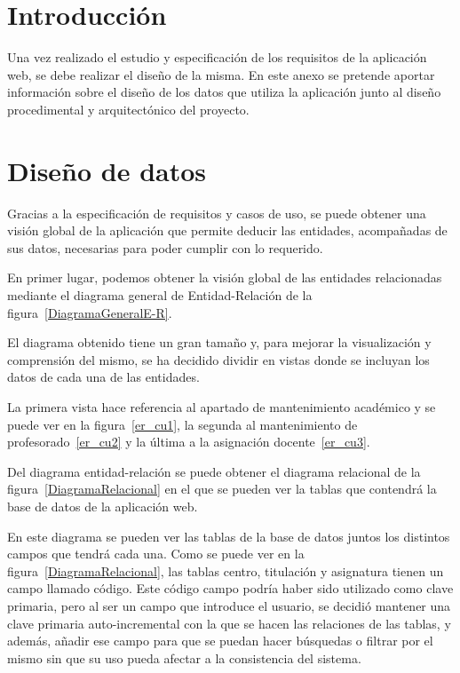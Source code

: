 
\section{Introducción}
Una vez realizado el estudio y especificación de los requisitos de la aplicación web, se debe realizar el diseño de la misma. En este anexo se pretende aportar información sobre el diseño de los datos que utiliza la aplicación junto al diseño procedimental y arquitectónico del proyecto.

\section{Diseño de datos}
Gracias a la especificación de requisitos y casos de uso, se puede obtener una visión global de la aplicación que permite deducir las entidades, acompañadas de sus datos, necesarias para poder cumplir con lo requerido.

En primer lugar, podemos obtener la visión global de las entidades relacionadas mediante el diagrama general de Entidad-Relación de la figura~\ref{DiagramaGeneralE-R}.

El diagrama obtenido tiene un gran tamaño y, para mejorar la visualización y comprensión del mismo, se ha decidido dividir en vistas donde se incluyan los datos de cada una de las entidades.

La primera vista hace referencia al apartado de mantenimiento académico y se puede ver en la figura~\ref{er_cu1}, la segunda al mantenimiento de profesorado~\ref{er_cu2} y la última a la asignación docente~\ref{er_cu3}.



Del diagrama entidad-relación se puede obtener el diagrama relacional de la figura~\ref{DiagramaRelacional} en el que se pueden ver la tablas que contendrá la base de datos de la aplicación web.

En este diagrama se pueden ver las tablas de la base de datos juntos los distintos campos que tendrá cada una.
Como se puede ver en la figura~\ref{DiagramaRelacional}, las tablas centro, titulación y asignatura tienen un campo llamado código. 
Este código campo podría haber sido utilizado como clave primaria, pero al ser un campo que introduce el usuario, se decidió mantener una clave primaria auto-incremental con la que se hacen las relaciones de las tablas, y además, añadir ese campo para que se puedan hacer búsquedas o filtrar por el mismo sin que su uso pueda afectar a la consistencia del sistema.

